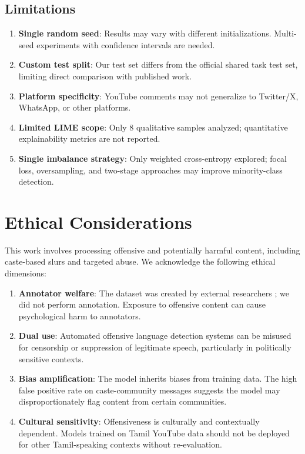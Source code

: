 \documentclass[conference]{IEEEtran}
\begin{document}
\subsection{Limitations}

\begin{enumerate}
    \item \textbf{Single random seed}: Results may vary with different initializations. Multi-seed experiments with confidence intervals are needed.
    \item \textbf{Custom test split}: Our test set differs from the official shared task test set, limiting direct comparison with published work.
    \item \textbf{Platform specificity}: YouTube comments may not generalize to Twitter/X, WhatsApp, or other platforms.
    \item \textbf{Limited LIME scope}: Only 8 qualitative samples analyzed; quantitative explainability metrics are not reported.
    \item \textbf{Single imbalance strategy}: Only weighted cross-entropy explored; focal loss, oversampling, and two-stage approaches may improve minority-class detection.
\end{enumerate}

\section{Ethical Considerations}

This work involves processing offensive and potentially harmful content, including caste-based slurs and targeted abuse. We acknowledge the following ethical dimensions:

\begin{enumerate}
    \item \textbf{Annotator welfare}: The dataset was created by external researchers \cite{chakravarthi2021dataset}; we did not perform annotation. Exposure to offensive content can cause psychological harm to annotators.
    \item \textbf{Dual use}: Automated offensive language detection systems can be misused for censorship or suppression of legitimate speech, particularly in politically sensitive contexts.
    \item \textbf{Bias amplification}: The model inherits biases from training data. The high false positive rate on caste-community messages suggests the model may disproportionately flag content from certain communities.
    \item \textbf{Cultural sensitivity}: Offensiveness is culturally and contextually dependent. Models trained on Tamil YouTube data should not be deployed for other Tamil-speaking contexts without re-evaluation.
\end{enumerate}
\end{document}
